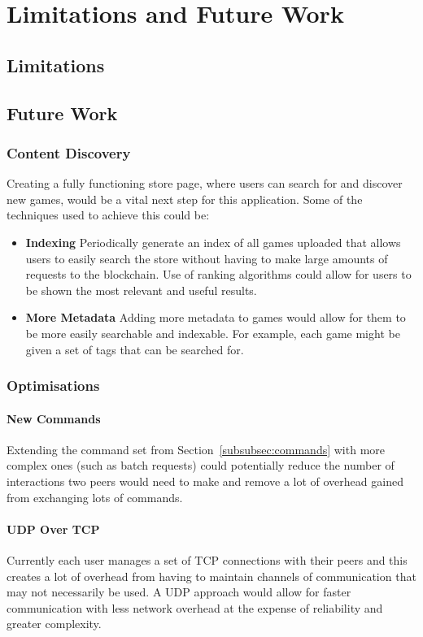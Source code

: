 \section{Limitations and Future Work}

\subsection{Limitations}

\subsection{Future Work}

\subsubsection*{Content Discovery}
Creating a fully functioning store page, where users can search for and discover new games, would be a vital next step for this application. Some of the techniques used to achieve this could be:

\begin{itemize}
  \item \textbf{Indexing} Periodically generate an index of all games uploaded that allows users to easily search the store without having to make large amounts of requests to the blockchain. Use of ranking algorithms could allow for users to be shown the most relevant and useful results.
  \item \textbf{More Metadata} Adding more metadata to games would allow for them to be more easily searchable and indexable. For example, each game might be given a set of tags that can be searched for.
\end{itemize}

\subsubsection*{Optimisations}

\paragraph*{New Commands}
Extending the command set from Section~\ref{subsubsec:commands} with more complex ones (such as batch requests) could potentially reduce the number of interactions two peers would need to make and remove a lot of overhead gained from exchanging lots of commands.

\paragraph*{UDP Over TCP}
Currently each user manages a set of TCP connections with their peers and this creates a lot of overhead from having to maintain channels of communication that may not necessarily be used. A UDP approach would allow for faster communication with less network overhead at the expense of reliability and greater complexity.

